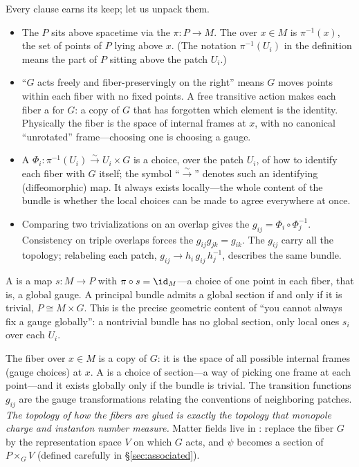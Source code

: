 \documentclass[11pt]{article}
\begin{document}
Every clause earns its keep; let us unpack them.
\begin{itemize}
\item The  $P$ sits above spacetime via the 
$\pi:P\to M$. The  over $x\in M$ is $\pi^{-1}(x)$, the set of points of $P$
lying above $x$. (The notation $\pi^{-1}(U_i)$ in the definition means the part of $P$
sitting above the patch $U_i$.)
\item ``$G$ acts freely and fiber-preservingly on the right'' means $G$ moves points
within each fiber with no fixed points. A free transitive action makes each fiber a
 for $G$: a copy of $G$ that has forgotten which element is the identity.
Physically the fiber is the space of internal frames at $x$, with no canonical
``unrotated'' frame---choosing one is choosing a gauge.
\item A  $\Phi_i:\pi^{-1}(U_i)\xrightarrow{\sim}U_i\times G$
is a choice, over the patch $U_i$, of how to identify each fiber with $G$ itself; the
symbol ``$\xrightarrow{\sim}$'' denotes such an identifying (diffeomorphic) map. It always
exists locally---the whole content of the bundle is whether the local choices can be made
to agree everywhere at once.
\item Comparing two trivializations on an overlap gives the 
$g_{ij}=\Phi_i\circ\Phi_j^{-1}$. Consistency on triple overlaps forces the
 $g_{ij}g_{jk}=g_{ik}$. The $g_{ij}$ carry all the topology;
relabeling each patch, $g_{ij}\to h_i\,g_{ij}\,h_j^{-1}$, describes the same bundle.
\end{itemize}

A  is a map $s:M\to P$ with $\pi\circ s=\id_M$---a choice of one point in
each fiber, that is, a global gauge. A principal bundle admits a global section if and
only if it is trivial, $P\cong M\times G$. This is the precise geometric content of ``you
cannot always fix a gauge globally'': a nontrivial bundle has no global section, only
local ones $s_i$ over each $U_i$.

\begin{iintuition}
The fiber over $x\in M$ is a copy of $G$: it is the space of all possible internal
frames (gauge choices) at $x$. A  is a choice of section---a way of picking
one frame at each point---and it exists globally only if the bundle is trivial. The
transition functions $g_{ij}$ are the gauge transformations relating the conventions of
neighboring patches. \emph{The topology of how the fibers are glued is exactly the
topology that monopole charge and instanton number measure.} Matter fields live in
: replace the fiber $G$ by the representation space $V$ on
which $G$ acts, and $\psi$ becomes a section of $P\times_G V$ (defined carefully in \S\ref{sec:associated}).
\end{iintuition}
\end{document}

